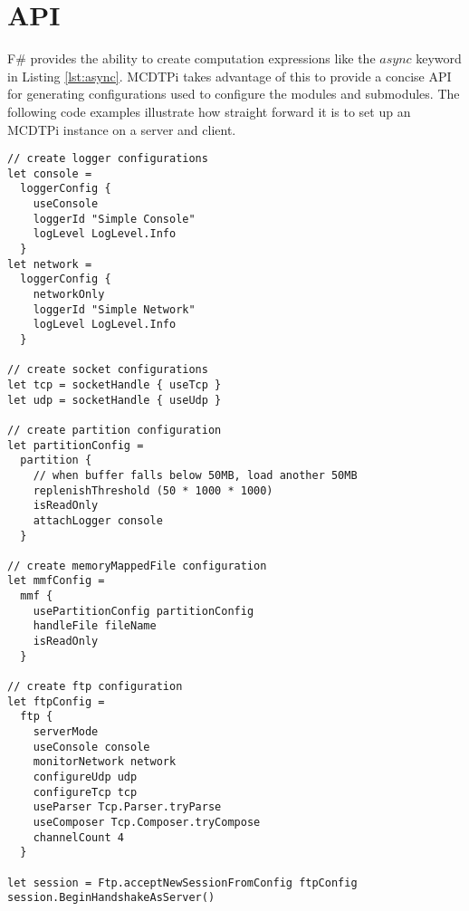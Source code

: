 \section{API}\label{sec:api}

F\# provides the ability to create computation expressions like the $async$ keyword in Listing \ref{lst:async}. MCDTPi takes advantage of this to provide a concise API for generating configurations used to configure the modules and submodules. The following code examples illustrate how straight forward it is to set up an MCDTPi instance on a server and client.

\begin{lstlisting}[caption=Server Example]
// create logger configurations
let console =
  loggerConfig {
    useConsole
    loggerId "Simple Console"
    logLevel LogLevel.Info
  }
let network =
  loggerConfig {
    networkOnly
    loggerId "Simple Network"
    logLevel LogLevel.Info
  }

// create socket configurations
let tcp = socketHandle { useTcp }
let udp = socketHandle { useUdp }

// create partition configuration
let partitionConfig =
  partition {
    // when buffer falls below 50MB, load another 50MB
    replenishThreshold (50 * 1000 * 1000)
    isReadOnly
    attachLogger console
  }

// create memoryMappedFile configuration
let mmfConfig =
  mmf {
    usePartitionConfig partitionConfig
    handleFile fileName
    isReadOnly
  }

// create ftp configuration
let ftpConfig =
  ftp {
    serverMode
    useConsole console
    monitorNetwork network
    configureUdp udp
    configureTcp tcp
    useParser Tcp.Parser.tryParse
    useComposer Tcp.Composer.tryCompose
    channelCount 4
  }

let session = Ftp.acceptNewSessionFromConfig ftpConfig
session.BeginHandshakeAsServer()

\end{lstlisting}

\newpage

